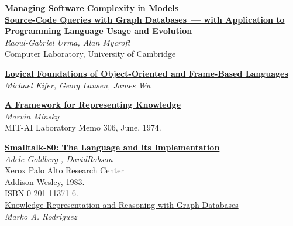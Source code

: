 \begin{thebibliography}{99}

\href{https://insights.sei.cmu.edu/sei_blog/2015/09/managing-software-complexity-in-models.html}{\textbf{Managing
Software Complexity in Models}}\\

\href{https://www.repository.cam.ac.uk/bitstream/handle/1810/247929/Urma%20and%20Mycroft%202013%20Science%20of%20Computer%20Programming.pdf}{\textbf{Source-Code
Queries with Graph Databases\ --- with Application to Programming Language Usage and Evolution}}\\
\textit{Raoul-Gabriel Urma, Alan Mycroft}\\
Computer Laboratory, University of Cambridge

\href{http://www3.cs.stonybrook.edu/~kifer/TechReports/flogic.pdf}{\textbf{Logical
Foundations of Object-Oriented and Frame-Based Languages}}\\
\textit{Michael Kifer, Georg Lausen, James Wu}

\href{https://web.media.mit.edu/~minsky/papers/Frames/frames.html}{\textbf{A
Framework for Representing Knowledge}}\\
\textit{Marvin Minsky}\\
MIT-AI Laboratory Memo 306, June, 1974.

\href{http://stephane.ducasse.free.fr/FreeBooks/BlueBook/Bluebook.pdf}{\textbf{Smalltalk-80:
The Language and its Implementation}}\\
\textit{Adele Goldberg , DavidRobson}\\
Xerox Palo Alto Research Center\\
Addison Wesley, 1983.\\
ISBN 0-201-11371-6.\\

\href{https://markorodriguez.com/2011/02/23/knowledge-representation-and-reasoning-with-graph-databases/}{Knowledge
Representation and Reasoning with Graph Databases}\\
\textit{Marko A. Rodriguez}

\end{thebibliography}
